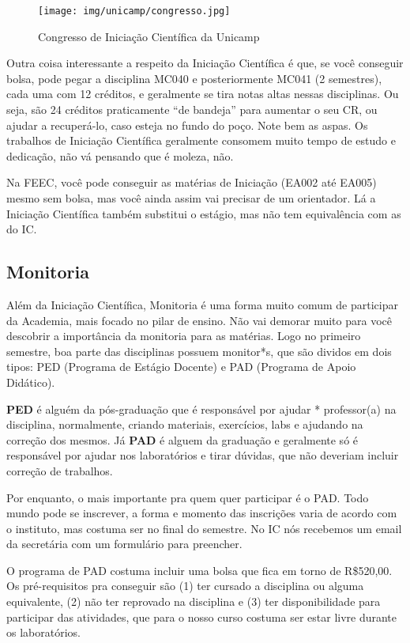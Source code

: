 \begin{figure}[h!]
    \centering
    \texttt{[image: img/unicamp/congresso.jpg]}
    \caption*{Congresso de Iniciação Científica da Unicamp}
\end{figure}

Outra coisa interessante a respeito da Iniciação Científica é que, se você
conseguir bolsa, pode pegar a disciplina MC040 e posteriormente MC041 (2
semestres), cada uma com 12 créditos, e geralmente se tira notas altas nessas
disciplinas.  Ou seja, são 24 créditos praticamente ``de bandeja'' para
aumentar o seu CR, ou ajudar a recuperá-lo, caso esteja no fundo do poço. Note
bem as aspas. Os trabalhos de Iniciação Científica geralmente consomem muito
tempo de estudo e dedicação, não vá pensando que é moleza, não.

Na FEEC, você pode conseguir as matérias de Iniciação (EA002 até EA005) mesmo
sem bolsa, mas você ainda assim vai precisar de um orientador. Lá a Iniciação
Científica também substitui o estágio, mas não tem equivalência com as do IC.

\subsection{Monitoria}

Além da Iniciação Científica, Monitoria é uma forma muito comum de participar
da Academia, mais focado no pilar de ensino. Não vai demorar muito para você
descobrir a importância da monitoria para as matérias. Logo no primeiro
semestre, boa parte das disciplinas possuem monitor*s, que são dividos em dois
tipos: PED (Programa de Estágio Docente) e PAD (Programa de Apoio Didático).

\textbf{PED} é alguém da pós-graduação que é responsável por ajudar *
professor(a) na disciplina, normalmente, criando materiais, exercícios, labs e
ajudando na correção dos mesmos. Já \textbf{PAD} é alguem da graduação e
geralmente só é responsável por ajudar nos laboratórios e tirar dúvidas, que
não deveriam incluir correção de trabalhos.

Por enquanto, o mais importante pra quem quer participar é o PAD. Todo mundo
pode se inscrever, a forma e momento das inscrições varia de acordo com o
instituto, mas costuma ser no final do semestre. No IC nós recebemos um email
da secretária com um formulário para preencher.

O programa de PAD costuma incluir uma bolsa que fica em torno de R\$520,00.
Os pré-requisitos pra conseguir são (1) ter cursado a disciplina ou alguma
equivalente, (2) não ter reprovado na disciplina e (3) ter disponibilidade para
participar das atividades, que para o nosso curso costuma ser estar livre
durante os laboratórios.

